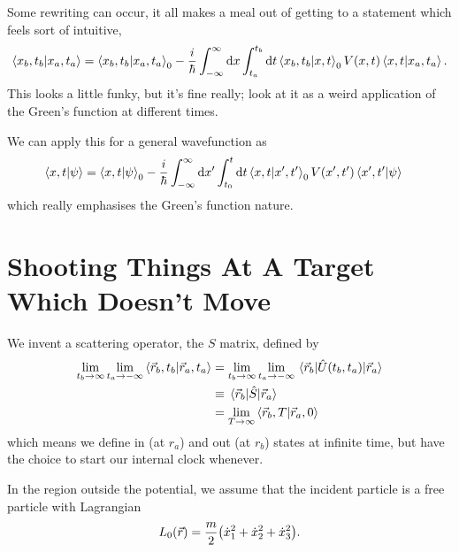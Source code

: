 \documentclass[]{revision-notes}
\begin{document}
Some rewriting can occur, it all makes a meal out of getting to a statement which feels sort of intuitive, \begin{equation*}
  \braket{x_b, t_b}{x_a, t_a} = \braket{x_b, t_b}{x_a, t_a}_0  - \frac{i}{\hbar} \int_{-\infty}^\infty \dd{x} \int_{t_a}^{t_b} \dd{t} \braket{x_b, t_b}{x, t}_0 V(x, t) \braket{x, t}{x_a, t_a}.
\end{equation*}
This looks a little funky, but it's fine really; look at it as a weird application of the Green's function at different times.

We can apply this for a general wavefunction as
\begin{align*}
  \braket{x, t}{\psi} &= \braket{x, t}{\psi}_0 - \frac{i}{\hbar}\int_{-\infty}^\infty \dd{x^\prime} \int_{t_0}^t \dd{t} \braket{x, t}{x^\prime, t^\prime}_0 V(x^\prime, t^\prime) \braket{x^\prime, t^\prime}{\psi}
\end{align*}
which really emphasises the Green's function nature.

\section{Shooting Things At A Target Which Doesn't Move}
We invent a scattering operator, the \(S\) matrix, defined by
\begin{align*}
  \lim_{t_b \to \infty} \lim_{t_a \to -\infty} \braket{\vec{r}_b, t_b}{\vec{r}_a, t_a} &=   \lim_{t_b \to \infty} \lim_{t_a \to -\infty} \mel{\vec{r}_b}{\hat{U}(t_b, t_a)}{\vec{r}_a}\\
  &\equiv \mel{\vec{r}_b}{\hat{S}}{\vec{r}_a}\\
  &= \lim_{T \to \infty} \braket{\vec{r}_b, T}{\vec{r}_a, 0}
\end{align*}
which means we define in (at \( r_a \)) and out (at \( r_b \)) states at infinite time, but have the choice to start our internal clock whenever.

In the region outside the potential, we assume that the incident particle is a free particle with Lagrangian \[L_0 (\vec{r}) = \frac{m}{2} \qty(\dot{x}_1^2 + \dot{x}_2^2 + \dot{x}_3^2).\]
\end{document}
